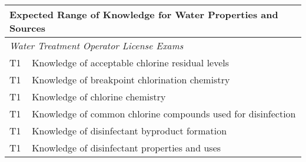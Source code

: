 \begin{table}[H]
\begin{tabular}{| m{1cm} |m{15cm} |}
\hline
\multicolumn{2}{|l|}{\textbf{Expected   Range of Knowledge for Water Properties and Sources}}                                                                      \\ \hline
\multicolumn{2}{|l|}{\textit{Water   Treatment Operator License Exams}}                                                                  \\ \hline
T1 & Knowledge of   acceptable chlorine residual levels                                   \\ \hline
T1 & Knowledge of   breakpoint chlorination chemistry                                     \\ \hline
T1 & Knowledge of chlorine   chemistry                                                    \\ \hline
T1 & Knowledge of common   chlorine compounds used for disinfection                       \\ \hline
T1 & Knowledge of   disinfectant byproduct formation                                      \\ \hline
T1 & Knowledge of   disinfectant properties and uses                                      \\ \hline
\end{tabular}
\end{table}
\newpage


